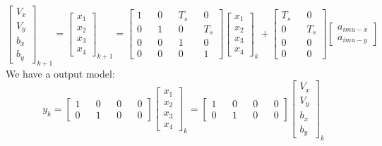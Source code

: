 	\begin{equation}
		\boxed{
			\begin{bmatrix}
				V_x \\
				V_y \\
				b_x \\
				b_y 
			\end{bmatrix}_{k+1} =
			\begin{bmatrix}
				x_1 \\
				x_2 \\
				x_3 \\
				x_4 
			\end{bmatrix}_{k+1} = 
			\begin{bmatrix}
				1 &   & 0 &   & T_s &   & 0   \\
				0 &   & 1 &   & 0   &   & T_s \\
				0 &   & 0 &   & 1   &   & 0   \\
				0 &   & 0 &   & 0   &   & 1   
			\end{bmatrix}
			\begin{bmatrix}
				x_1 \\
				x_2 \\
				x_3 \\
				x_4 
			\end{bmatrix}_k +
			\begin{bmatrix}
				T_s &   & 0   \\
				0   &   & T_s \\
				0   &   & 0   \\
				0   &   & 0   
			\end{bmatrix}
			\begin{bmatrix}
				a_{imu-x} \\
				a_{imu-y} 
			\end{bmatrix}
		}
		\label{sensorfuseq17}
	\end{equation}
	We have a output model:
	\begin{equation}
		\boxed{
			y_k = 
			\begin{bmatrix}
				1 &   & 0 &   & 0 &   & 0 \\
				0 &   & 1 &   & 0 &   & 0 
			\end{bmatrix}
			\begin{bmatrix}
				x_1 \\
				x_2 \\
				x_3 \\
				x_4 
			\end{bmatrix}_k =
			\begin{bmatrix}
				1 &   & 0 &   & 0 &   & 0 \\
				0 &   & 1 &   & 0 &   & 0 
			\end{bmatrix}
			\begin{bmatrix}
				V_x \\
				V_y \\
				b_x \\
				b_y 
			\end{bmatrix}_k
		}
		\label{sensorfuseq18}
	\end{equation}

